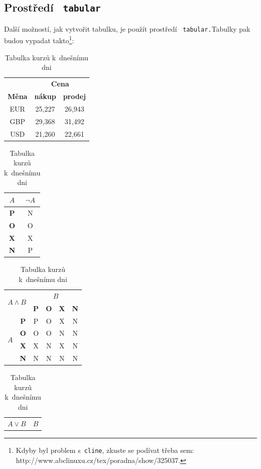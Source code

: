\documentclass[11pt,a4paper]{article}
\begin{document}
\subsection{Prostředí \texttt{ tabular }}
Další možností, jak vytvořit tabulku, je použít prostředí \verb| tabular.|Tabulky pak 
budou vypadat takto\footnote{Kdyby byl problem s~\texttt{cline}, zkuste se podívat třeba sem: http://www.abclinuxu.cz/tex/poradna/show/325037.}:
\begin{table}[h]
\begin{center}
\begin{tabular}{|c|c|c|}\hline & 
    \multicolumn{2}{c|}{\textbf{Cena}}\\\cline{2-3}
    \textbf{Měna} & \textbf{nákup} & \textbf{prodej}\\\hline
    EUR & 25,227 & 26,943\\ 
    GBP & 29,368 & 31,492\\ 
    USD & 21,260 & 22,661\\\hline
    \end{tabular}
\caption{Tabulka kurzů k~dnešnímu dni}\label{tabulka1}
\bigskip\bigskip\bigskip
\begin{tabular}{|c|c|}\hline
    $A$ & $\neg{A}$\\\hline
    \textbf{P} & {N}\\\hline
    \textbf{O} & {O}\\\hline
    \textbf{X} & {X}\\\hline
    \textbf{N} & {P}\\\hline
\end{tabular}
\begin{tabular}{|c|c|c|c|c|c|}\hline
    \multicolumn{2}{|c|}{\multirow{2}{*}{${A}\wedge{B}$}} & \multicolumn{4}{c|}{$B$}\\\cline{3-6}
    \multicolumn{2}{|c|}{} & \textbf{P} & \textbf{O} & \textbf{X} & \textbf{N}\\\hline
    \multirow{4}{*}{${A}$} & \textbf{P} & {P} & {O} & {X} & {N}\\\cline{2-6}
    & \textbf{O} & {O} & {O} & {N} & {N}\\\cline{2-6}
    & \textbf{X} & {X} & {N} & {X} & {N}\\\cline{2-6}
    & \textbf{N} & {N} & {N} & {N} & {N}\\\hline
\end{tabular}
\begin{tabular}{|c|c|c|c|c|c|}\hline
    \multicolumn{2}{|c|}{\multirow{2}{*}{${A}\vee{B}$}} & \multicolumn{4}{c|}{$B$}\\\cline{3-6}

\end{tabular}
\end{center}
\end{table}
\end{document}
